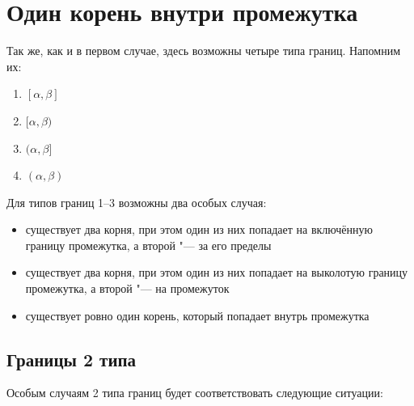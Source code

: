 \section {Один корень внутри промежутка}

Так же, как и в первом случае, здесь возможны четыре типа границ. Напомним их:

\begin {enumerate} [labelindent=\parindent, leftmargin=*]
    \item {$[\alpha, \beta]$}
    \item {$[\alpha, \beta)$}
    \item {$(\alpha, \beta]$}
    \item {$(\alpha, \beta)$}
\end {enumerate}

Для типов границ 1--3 возможны два особых случая:

\begin {itemize}
    \item {существует два корня, при этом один из них попадает на включённую границу промежутка, а
           второй "--- за его пределы}
    \item {существует два корня, при этом один из них попадает на выколотую границу промежутка, а
           второй "--- на промежуток}
    \item {существует ровно один корень, который попадает внутрь промежутка}
\end {itemize}

\subsection {Границы 2 типа}

Особым случаям 2 типа границ будет соответствовать следующие ситуации:

